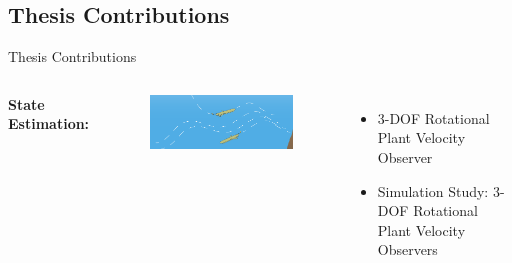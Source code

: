 \subsection{Thesis Contributions}
\begin{frame}{Thesis Contributions}

{\small
{
   \begin{columns}
{\color{blue} \bf State Estimation:}
    \begin{center}
      \begin{figure}[t!]
        \begin{center}
          \includegraphics[width=\textwidth]{./pres/images/justGliders}
        \end{center}
      \end{figure}
    \end{center}
   \begin{itemize}
\item<1> 3-DOF Rotational Plant Velocity Observer %
\item<1> Simulation Study: 3-DOF Rotational Plant Velocity Observers
   \end{itemize}%
\end{columns}}

}
\end{frame}
